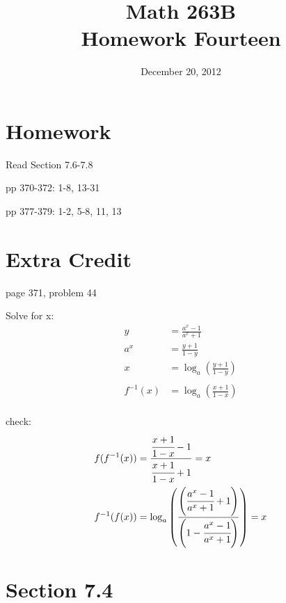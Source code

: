 \documentclass{exam}
\title{Math 263B \\ Homework Fourteen}
\date{December 20, 2012}
\begin{document}
\maketitle

\section{Homework}

\begin{itemize*}
  \item Read Section 7.6-7.8
  \item pp 370-372: 1-8, 13-31
  \item pp 377-379: 1-2, 5-8, 11, 13
\end{itemize*}

\ifprintanswers
\pagebreak
\fi

\section{Extra Credit}
page 371, problem 44

\ifprintanswers
\begin{solution}
Solve for x:
\begin{align*}
  y &= \frac{a^x - 1}{a^x + 1} \\
  a^x &= \frac{y + 1}{1 - y} \\
  x &= \log_a \left( \frac{y + 1}{1 - y} \right) \\
\\
  f^{-1}(x) &= \log_a \left( \frac{x + 1}{1 - x} \right) \\
\end{align*}

check:
\begin{align*}
  f(f^{-1}(x)) &= \frac{\cfrac{x + 1}{1 - x} - 1}{\cfrac{x + 1}{1 - x} + 1} = x \\
  f^{-1}(f(x)) &= \log_a \left( \frac{\left( \cfrac{a^x - 1}{a^x + 1} + 1 \right)}{\left(1 - \cfrac{a^x - 1}{a^x + 1} \right)} \right) = x \\
\end{align*}

\end{solution}

\section{Section 7.4}
\end{document}
